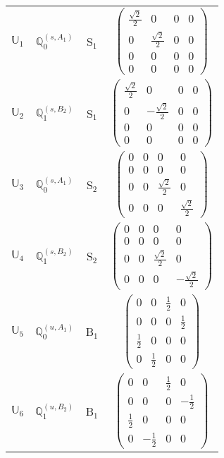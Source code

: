 \documentclass[fleqn,10pt,landscape]{article}
\begin{document}
\begin{itemize}
\begin{center}
\begin{longtable}{c|c|c|c}
$ \mathbb{U}_{1} $ & $\mathbb{Q}_{0}^{(s,A_{1})}$ & S$_{1}$ & $\begin{pmatrix} \frac{\sqrt{2}}{2} & 0 & 0 & 0 \\ 0 & \frac{\sqrt{2}}{2} & 0 & 0 \\ 0 & 0 & 0 & 0 \\ 0 & 0 & 0 & 0 \end{pmatrix}$ \\
$ \mathbb{U}_{2} $ & $\mathbb{Q}_{1}^{(s,B_{2})}$ & S$_{1}$ & $\begin{pmatrix} \frac{\sqrt{2}}{2} & 0 & 0 & 0 \\ 0 & - \frac{\sqrt{2}}{2} & 0 & 0 \\ 0 & 0 & 0 & 0 \\ 0 & 0 & 0 & 0 \end{pmatrix}$ \\ \hline
$ \mathbb{U}_{3} $ & $\mathbb{Q}_{0}^{(s,A_{1})}$ & S$_{2}$ & $\begin{pmatrix} 0 & 0 & 0 & 0 \\ 0 & 0 & 0 & 0 \\ 0 & 0 & \frac{\sqrt{2}}{2} & 0 \\ 0 & 0 & 0 & \frac{\sqrt{2}}{2} \end{pmatrix}$ \\
$ \mathbb{U}_{4} $ & $\mathbb{Q}_{1}^{(s,B_{2})}$ & S$_{2}$ & $\begin{pmatrix} 0 & 0 & 0 & 0 \\ 0 & 0 & 0 & 0 \\ 0 & 0 & \frac{\sqrt{2}}{2} & 0 \\ 0 & 0 & 0 & - \frac{\sqrt{2}}{2} \end{pmatrix}$ \\ \hline
$ \mathbb{U}_{5} $ & $\mathbb{Q}_{0}^{(u,A_{1})}$ & B$_{1}$ & $\begin{pmatrix} 0 & 0 & \frac{1}{2} & 0 \\ 0 & 0 & 0 & \frac{1}{2} \\ \frac{1}{2} & 0 & 0 & 0 \\ 0 & \frac{1}{2} & 0 & 0 \end{pmatrix}$ \\
$ \mathbb{U}_{6} $ & $\mathbb{Q}_{1}^{(u,B_{2})}$ & B$_{1}$ & $\begin{pmatrix} 0 & 0 & \frac{1}{2} & 0 \\ 0 & 0 & 0 & - \frac{1}{2} \\ \frac{1}{2} & 0 & 0 & 0 \\ 0 & - \frac{1}{2} & 0 & 0 \end{pmatrix}$ \\

\end{longtable}
\end{center}
\end{itemize}
\end{document}
